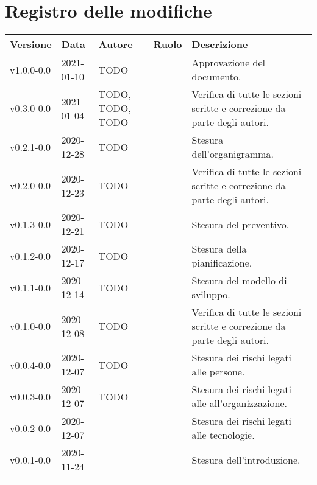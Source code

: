 \section*{\hfil Registro delle modifiche \hfil}
{
	\newlength{\freewidth}
	\setlength{\freewidth}{\dimexpr\textwidth-10\tabcolsep}
	\renewcommand{\arraystretch}{1.5}
	\centering
	\setlength{\aboverulesep}{0pt}
	\setlength{\belowrulesep}{0pt}
	\begin{longtable}{C{.131777\freewidth} C{.134036\freewidth} C{.263554\freewidth} C{.188254\freewidth} C{.282379\freewidth}}
		\toprule 
		\textbf{Versione} & \textbf{Data} & \textbf{Autore} & \textbf{Ruolo} & \textbf{Descrizione}\\
		\toprule
		\endhead

		v1.0.0-0.0 & 2021-01-10 & TODO & \RdP{} & Approvazione del documento. \\
		v0.3.0-0.0 & 2021-01-04 & TODO, TODO, TODO & \vers{} & Verifica di tutte le sezioni scritte e correzione da parte degli autori. \\

		v0.2.1-0.0 & 2020-12-28 & TODO & \ana{} & Stesura dell'organigramma. \\

		v0.2.0-0.0 & 2020-12-23 & TODO & \ver{} & Verifica di tutte le sezioni scritte e correzione da parte degli autori. \\
		v0.1.3-0.0 & 2020-12-21 & TODO & \ana{} & Stesura del preventivo. \\
		v0.1.2-0.0 & 2020-12-17 & TODO & \ana{} & Stesura della pianificazione. \\
		v0.1.1-0.0 & 2020-12-14 & TODO & \ana{} & Stesura del modello di sviluppo. \\

		v0.1.0-0.0 & 2020-12-08 & TODO & \ver{} & Verifica di tutte le sezioni scritte e correzione da parte degli autori. \\
		v0.0.4-0.0 & 2020-12-07 & TODO & \ana{} & Stesura dei rischi legati alle persone. \\
		v0.0.3-0.0 & 2020-12-07 & TODO & \ana{} & Stesura dei rischi legati alle all'organizzazione. \\
		v0.0.2-0.0 & 2020-12-07 & \Matteo{} & \ana{} & Stesura dei rischi legati alle tecnologie. \\
		v0.0.1-0.0 & 2020-11-24 & \Tommaso{} & \ana{} & Stesura dell'introduzione. \\
		
		\bottomrule
		\hiderowcolors
	\end{longtable}
}
